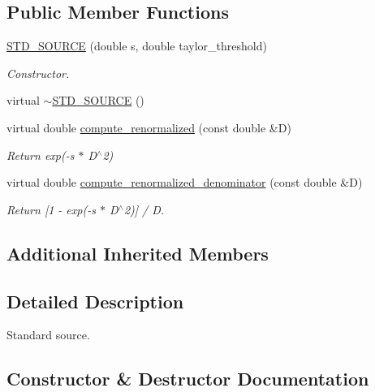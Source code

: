 \subsection*{Public Member Functions}
\begin{DoxyCompactItemize}
\item 
\mbox{\hyperlink{classforte_1_1_s_t_d___s_o_u_r_c_e_ab1e2ced264dbb1c0d952b15579a3694a}{S\+T\+D\+\_\+\+S\+O\+U\+R\+CE}} (double s, double taylor\+\_\+threshold)
\begin{DoxyCompactList}\small\item\em Constructor. \end{DoxyCompactList}\item 
virtual \mbox{\hyperlink{classforte_1_1_s_t_d___s_o_u_r_c_e_a9dfff9e6d7c285ceb1ba28fde3a310b1}{$\sim$\+S\+T\+D\+\_\+\+S\+O\+U\+R\+CE}} ()
\item 
virtual double \mbox{\hyperlink{classforte_1_1_s_t_d___s_o_u_r_c_e_a37548c104ca908d43d239638ad8b7cde}{compute\+\_\+renormalized}} (const double \&D)
\begin{DoxyCompactList}\small\item\em Return exp(-\/s $\ast$ D$^\wedge$2) \end{DoxyCompactList}\item 
virtual double \mbox{\hyperlink{classforte_1_1_s_t_d___s_o_u_r_c_e_a3f9dda1563d4679949001e604324eb16}{compute\+\_\+renormalized\+\_\+denominator}} (const double \&D)
\begin{DoxyCompactList}\small\item\em Return \mbox{[}1 -\/ exp(-\/s $\ast$ D$^\wedge$2)\mbox{]} / D. \end{DoxyCompactList}\end{DoxyCompactItemize}
\subsection*{Additional Inherited Members}


\subsection{Detailed Description}
Standard source. 

\subsection{Constructor \& Destructor Documentation}
\mbox{\label{classforte_1_1_s_t_d___s_o_u_r_c_e_ab1e2ced264dbb1c0d952b15579a3694a}} 
